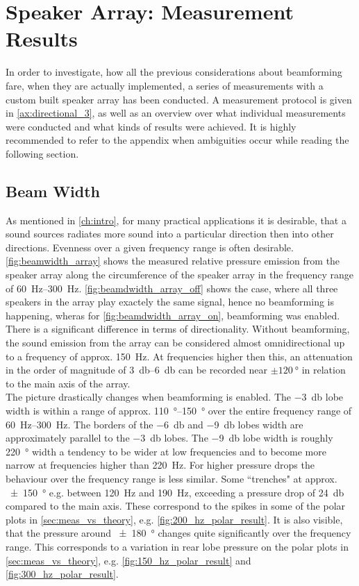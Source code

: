 \section{Speaker Array: Measurement Results}
In order to investigate, how all the previous considerations about beamforming fare, when they are actually implemented, a series of measurements with a custom built speaker array has been conducted. A measurement protocol is given in \autoref{ax:directional_3}, as well as an overview over what individual measurements were conducted and what kinds of results were achieved. It is highly recommended to refer to the appendix when ambiguities occur while reading the following section.

\subsection{Beam Width}
As mentioned in \autoref{ch:intro}, for many practical applications it is desirable, that a sound sources radiates more sound into a particular direction then into other directions. Evenness over a given frequency range is often desirable. \autoref{fig:beamwidth_array} shows the measured relative pressure emission from the speaker array along the circumference of the speaker array in the frequency range of \SIrange{60}{300}{\hertz}. \autoref{fig:beamdwidth_array_off} shows the case, where all three speakers in the array play exactely the same signal, hence no beamforming is happening, wheras for \autoref{fig:beamdwidth_array_on}, beamforming was enabled. 
There is a significant difference in terms of directionality. Without beamforming, the sound emission from the array can be considered almost omnidirectional up to a frequency of approx. \SI{150}{\hertz}. At frequencies higher then this, an attenuation in the order of magnitude of \SIrange{3}{6}{\decibel} can be recorded near $\pm \SI{120}{\degree}$ in relation to the main axis of the array.\\
The picture drastically changes when beamforming is enabled. The \SI{-3}{\decibel} lobe width is within a range of approx. \SIrange{110}{150}{\degree} over the entire frequency range of \SIrange{60}{300}{\hertz}. The borders of the \SI{-6}{\decibel} and \SI{-9}{\decibel} lobes width are approximately parallel to the \SI{-3}{\decibel} lobes. The \SI{-9}{\decibel} lobe width is roughly \SI{220}{\degree} width a tendency to be wider at low frequencies and to become more narrow at frequencies higher than \SI{220}{\hertz}. For higher pressure drops the behaviour over the frequency range is less similar. Some ``trenches" at approx. \SI{\pm 150}{\degree} e.g. between \SI{120}{\hertz} and \SI{190}{\hertz}, exceeding a pressure drop of \SI{24}{\decibel} compared to the main axis. These correspond to the spikes in some of the polar plots in \autoref{sec:meas_vs_theory}, e.g. \autoref{fig:200_hz_polar_result}. It is also visible, that the pressure around \SI{\pm 180}{\degree} changes quite significantly over the frequency range. This corresponds to a variation in rear lobe pressure on the polar plots in \autoref{sec:meas_vs_theory}, e.g. \autoref{fig:150_hz_polar_result} and \autoref{fig:300_hz_polar_result}.
